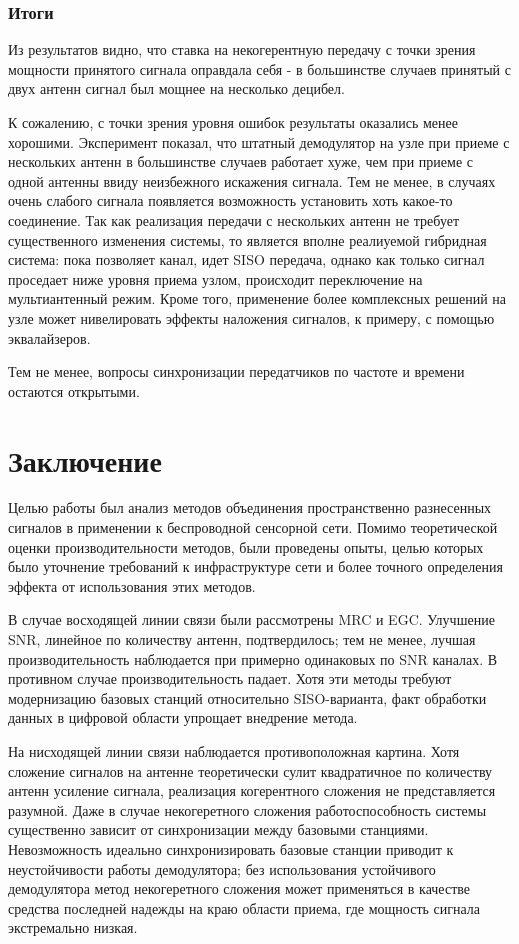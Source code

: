 \documentclass[a4paper,12pt,oneside]{scrartcl}
\begin{document}
\subsubsection{Итоги}

Из результатов видно, что ставка на некогерентную передачу с точки зрения мощности принятого сигнала оправдала себя - в большинстве случаев принятый с двух антенн сигнал был мощнее на несколько децибел.

К сожалению, с точки зрения уровня ошибок результаты оказались менее хорошими.
Эксперимент показал, что штатный демодулятор на узле при приеме с нескольких антенн в большинстве случаев работает хуже, чем при приеме с одной антенны ввиду неизбежного искажения сигнала. 
Тем не менее, в случаях очень слабого сигнала появляется возможность установить хоть какое-то соединение. 
Так как реализация передачи с нескольких антенн не требует существенного изменения системы, то является вполне реалиуемой гибридная система: пока позволяет канал, идет SISO передача, однако как только сигнал проседает ниже уровня приема узлом, происходит переключение на мультиантенный режим.
Кроме того, применение более комплексных решений на узле может нивелировать эффекты наложения сигналов, к примеру, с помощью эквалайзеров\cite{B2}.

Тем не менее, вопросы синхронизации передатчиков по частоте и времени остаются открытыми.

\clearpage

\section{Заключение}

Целью работы был анализ методов объединения пространственно разнесенных сигналов в применении к беспроводной сенсорной сети. 
Помимо теоретической оценки производительности методов, были проведены опыты, целью которых было уточнение требований к инфраструктуре сети и более точного определения эффекта от использования этих методов.

В случае восходящей линии связи были рассмотрены MRC и EGC.
Улучшение SNR, линейное по количеству антенн, подтвердилось; тем не менее, лучшая производительность наблюдается при примерно одинаковых по SNR каналах.
В противном случае производительность падает.
Хотя эти методы требуют модернизацию базовых станций относительно SISO-варианта, факт обработки данных в цифровой области упрощает внедрение метода.

На нисходящей линии связи наблюдается противоположная картина. 
Хотя сложение сигналов на антенне теоретически сулит квадратичное по количеству антенн усиление сигнала, реализация когерентного сложения не представляется разумной.
Даже в случае некогеретного сложения работоспособность системы существенно зависит от синхронизации между базовыми станциями.
Невозможность идеально синхронизировать базовые станции приводит к неустойчивости работы демодулятора; без использования устойчивого демодулятора метод некогеретного сложения может применяться в качестве средства последней надежды на краю области приема, где мощность сигнала экстремально низкая.
\end{document}
